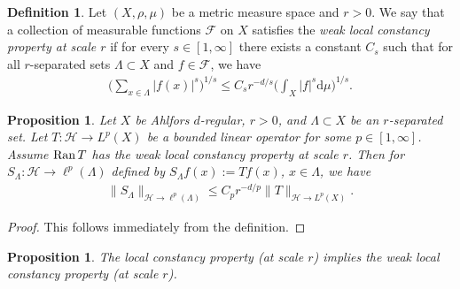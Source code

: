 \documentclass[12pt,reqno]{amsart}
\newtheorem{proposition}[theorem]{Proposition}
\theoremstyle{definition}
\newtheorem{definition}[theorem]{Definition}
\theoremstyle{remark}
\numberwithin{equation}{section}
\newcommand{\1}{\mathbbm{1}}
\def\rd{\mathrm{d}}
\newcommand{\Ran}{\mathop{\rm Ran}}
\begin{document}
\begin{definition}
Let $(X,\rho,\mu)$ be a metric measure space and $r>0$.
 We say that a collection of measurable functions $\mathcal{F}$ on $X$ satisfies the \emph{weak local constancy property at scale $r$} if for every $s\in [1,\infty]$ there exists a constant $C_s$ such that for all $r$-separated sets $\Lambda\subset X$ and $f\in \mathcal{F}$, we have 
\begin{align}\label{eq:abstract comparison ellp Lp} 
\Big(\sum_{x\in\Lambda}|f(x)|^s\Big)^{1/s}\leq C_sr^{-d/s}\Big(\int_X|f|^s
\rd\mu\Big)^{1/s}.
\end{align}
\end{definition}



\begin{proposition}\label{cor. abstract comparison ellp Lp}
  Let $X$ be Ahlfors $d$-regular, $r>0$, and $\Lambda\subset X$ be an $r$-separated set. Let $T:\mathcal{H}\to L^{p}(X)$ be a bounded linear operator for some $p\in [1,\infty]$. Assume $\Ran T$ has the weak local constancy property at scale $r$. Then for $S_{\Lambda}:\mathcal{H}\to \ell^{p}(\Lambda)$ defined by $S_{\Lambda}f(x):=Tf(x)$, $x\in\Lambda$, we have
  \begin{align*}
    \|S_{\Lambda}\|_{\mathcal{H}\to \ell^{p}(\Lambda)}\leq C_pr^{-d/p}\|T\|_{\mathcal{H}\to L^{p}(X)}.
  \end{align*}
\end{proposition}

\begin{proof}
  This follows immediately from the definition.
 \end{proof}

\begin{proposition}\label{prop. abstract comparison ellp Lp}
The local constancy property (at scale $r$) implies the weak local constancy property (at scale $r$).
\end{proposition}
\end{document}
